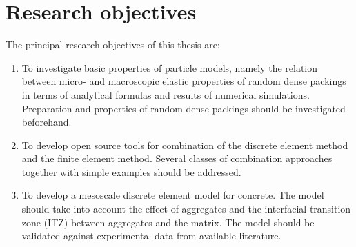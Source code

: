 \section{Research objectives}
The principal research objectives of this thesis are:
\begin{enumerate}

\item
To investigate basic properties of particle models, namely the relation between micro- and macroscopic elastic properties of random dense packings in terms of analytical formulas and results of numerical simulations.
Preparation and properties of random dense packings should be investigated beforehand.

\item
To develop open source tools for combination of the discrete element method and the finite element method.
Several classes of combination approaches together with simple examples should be addressed.

\item
To develop a mesoscale discrete element model for concrete.
The model should take into account the effect of aggregates and the interfacial transition zone (ITZ) between aggregates and the matrix.
The model should be validated against experimental data from available literature.

\end{enumerate}





\vfill



